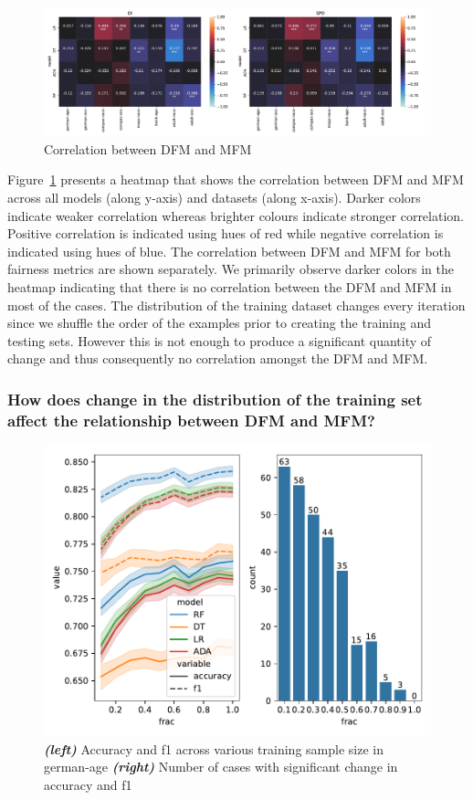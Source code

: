 \documentclass{article}
\begin{document}
\begin{figure}
  \centering
  \includegraphics[width=0.95\linewidth]{heatmap--corr--full-data.pdf}
  \caption{Correlation between DFM and MFM}
  \label{fig:heatmap--corr--full-data}
\end{figure}

Figure \ref{fig:heatmap--corr--full-data} presents a heatmap that
shows the correlation between DFM and MFM across all models (along
y-axis) and datasets (along x-axis). Darker colors indicate weaker
correlation whereas brighter colours indicate stronger
correlation. Positive correlation is indicated using hues of red while
negative correlation is indicated using hues of blue. The correlation
between DFM and MFM for both fairness metrics are shown separately. We
primarily observe darker colors in the heatmap indicating that there
is no correlation between the DFM and MFM in most of the cases. The
distribution of the training dataset changes every iteration since we
shuffle the order of the examples prior to creating the training and
testing sets. However this is not enough to produce a significant
quantity of change and thus consequently no correlation amongst the
DFM and MFM.

\subsubsection{How does change in the distribution of the training set
  affect the relationship between DFM and MFM?}\label{sec:results-full-rel-dist}

\begin{figure}
  \centering
  \includegraphics[width=0.95\linewidth]{training-set-frac-threshold.pdf}
  \caption{\emph{\textbf{(left)}} Accuracy and f1 across various
    training sample size in german-age \emph{\textbf{(right)}} Number
    of cases with significant change in accuracy and f1}
  \label{fig:training-set-frac-threshold}
\end{figure}
\end{document}
